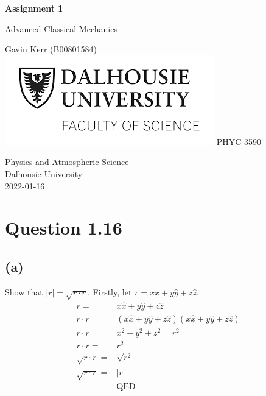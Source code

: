 \documentclass[12pt, a4paper]{article}
\begin{document}
\begin{titlepage}
   \begin{center}
       \vspace*{0.5cm}

       \LARGE{\textbf{Assignment 1}}

       \vspace{1cm}
        \Large{Advanced Classical Mechanics}
            
       \vspace{1cm}
		\small{Gavin Kerr (B00801584)} \\
		\vfill
		\includegraphics[scale=0.65]{dal_logo2.png}
       \vfill
           \large{PHYC 3590}
            
       \vspace{0.8cm}
     
            
       Physics and Atmospheric Science\\
       Dalhousie University\\
       2022-01-16
            
   \end{center}
\end{titlepage}



\section*{Question 1.16}
\subsection*{(a)}
Show that $|r| = \sqrt{r\cdot r}$. Firstly, let $r = x\hat{x} + y \hat{y} + z \hat{z}$.
\begin{align*}
r =& x\hat{x} + y \hat{y} + z \hat{z}
\\
r\cdot r =& (x\hat{x} + y \hat{y} + z \hat{z})(x\hat{x} + y \hat{y} + z \hat{z})
\\
r\cdot r =& x^2 + y^2 + z^2 = r^2
\\
r\cdot r =& r^2
\\
\sqrt{r\cdot r} =& \sqrt{r^2}
\\
\sqrt{r\cdot r} =& |r|
\\
&\text{QED}
\end{align*}
\end{document}
